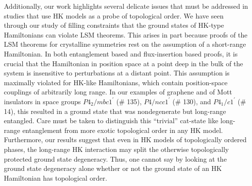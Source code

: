 \documentclass[prb,aps,amssymb,twocolumn,notitlepage]{revtex4-2}
\begin{document}
Additionally, our work highlights several delicate issues that must be addressed in studies that use HK models as a probe of topological order. 
We have seen through our study of filling constraints that the ground states of HK-type Hamiltonians can violate LSM theorems. 
This arises in part because proofs of the LSM theorems for crystalline symmetries rest on the assumption of a short-range Hamiltonian. 
In both entanglement based and flux-insertion based proofs, it is crucial that the Hamiltonian in position space at a point deep in the bulk of the system is insensitive to perturbations at a distant point. 
This assumption is maximally violated for HK-like Hamiltonians, which contain position-space couplings of arbitrarily long range. 
In our examples of graphene and of Mott insulators in space groups $P4_2/mbc1^\prime$ (\# 135), $P4/ncc1^\prime$ (\# 130), and $P4_1/c1^\prime$ (\# 14), this resulted in a ground state that was nondegenerate but long-range entangled. 
Care must be taken to distinguish this ``trivial'' cat-state like long-range entanglement from more exotic topological order in any HK model.  Furthermore, our results suggest that even in HK models of topologically ordered phases, the long-range HK interaction may split the otherwise topologically protected ground state degeneracy. 
Thus, one cannot say by looking at the ground state degeneracy alone whether or not the ground state of an HK Hamiltonian has topological order. 
\end{document}
